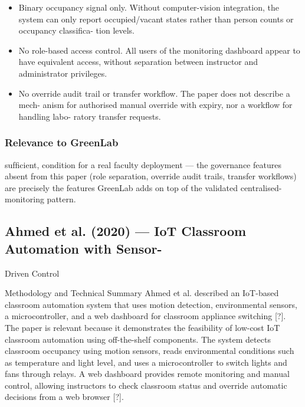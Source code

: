 \begin{itemize}
  \item Binary occupancy signal only. Without computer-vision integration, the system can
only report occupied/vacant states rather than person counts or occupancy classiﬁca-
tion levels.
\end{itemize}

\begin{itemize}
  \item No role-based access control. All users of the monitoring dashboard appear to have
equivalent access, without separation between instructor and administrator privileges.
\end{itemize}

\begin{itemize}
  \item No override audit trail or transfer workﬂow. The paper does not describe a mech-
anism for authorised manual override with expiry, nor a workﬂow for handling labo-
ratory transfer requests.
\end{itemize}



\subsubsection*{Relevance to GreenLab}

sufﬁcient, condition for a real faculty deployment --- the governance features absent from
this paper (role separation, override audit trails, transfer workﬂows) are precisely the features GreenLab adds on top of the validated centralised-monitoring pattern.



\subsection{Ahmed et al. (2020) --- IoT Classroom Automation with Sensor-}

Driven Control

Methodology and Technical Summary Ahmed et al. described an IoT-based classroom
automation system that uses motion detection, environmental sensors, a microcontroller,
and a web dashboard for classroom appliance switching [?]. The paper is relevant because
it demonstrates the feasibility of low-cost IoT classroom automation using off-the-shelf
components. The system detects classroom occupancy using motion sensors, reads environmental conditions such as temperature and light level, and uses a microcontroller to
switch lights and fans through relays. A web dashboard provides remote monitoring and
manual control, allowing instructors to check classroom status and override automatic decisions from a web browser [?].

